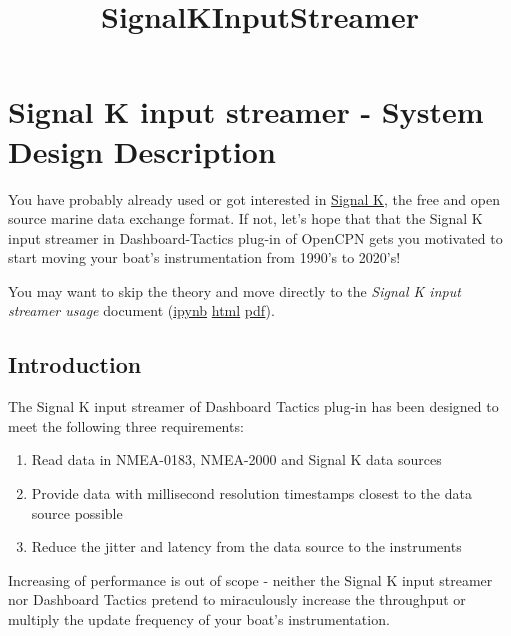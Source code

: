 \documentclass[11pt]{article}
\title{SignalKInputStreamer}
\providecommand{\tightlist}{%
      \setlength{\itemsep}{0pt}\setlength{\parskip}{0pt}}
\begin{document}
    
    \maketitle
    
    

    
    \hypertarget{signal-k-input-streamer---system-design-description}{%
\section{Signal K input streamer - System Design
Description}\label{signal-k-input-streamer---system-design-description}}

    You have probably already used or got interested in
\href{https://signalk.org/overview.html}{Signal K}, the free and open
source marine data exchange format. If not, let's hope that that the
Signal K input streamer in Dashboard-Tactics plug-in of OpenCPN gets you
motivated to start moving your boat's instrumentation from 1990's to
2020's!

You may want to skip the theory and move directly to the \emph{Signal K
input streamer usage} document
(\href{SignalKInputStreamerUsage.ipynb}{ipynb} \textbar{}
\href{SignalKInputStreamerUsage.html}{html} \textbar{}
\href{SignalKInputStreamerUsage.pdf}{pdf}).

    \hypertarget{introduction}{%
\subsection{Introduction}\label{introduction}}

    The Signal K input streamer of Dashboard Tactics plug-in has been
designed to meet the following three requirements:

    \begin{enumerate}
\def\labelenumi{\arabic{enumi}.}
\tightlist
\item
  Read data in NMEA-0183, NMEA-2000 and Signal K data sources
\item
  Provide data with millisecond resolution timestamps closest to the
  data source possible
\item
  Reduce the jitter and latency from the data source to the instruments
\end{enumerate}

    Increasing of performance is out of scope - neither the Signal K input
streamer nor Dashboard Tactics pretend to miraculously increase the
throughput or multiply the update frequency of your boat's
instrumentation.
\end{document}

